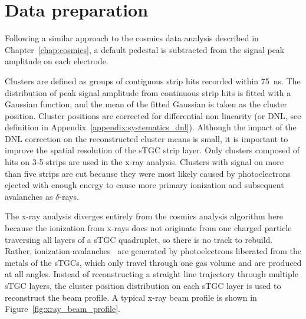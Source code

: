 \section{Data preparation}

Following a similar approach to the cosmics data analysis described in Chapter~\ref{chap:cosmics}, a default pedestal is subtracted from the signal peak amplitude on each electrode.

Clusters are defined as groups of contiguous strip hits recorded within \SI{75}{ns}. The distribution of peak signal amplitude from continuous strip hits is fitted with a Gaussian function, and the mean of the fitted Gaussian is taken as the cluster position. Cluster positions are corrected for differential non linearity (or DNL, see definition in Appendix~\ref{appendix:systematics_dnl}). Although the impact of the DNL correction on the reconstructed cluster means is small, it is important to improve the spatial resolution of the sTGC strip layer. Only clusters composed of hits on 3-5 strips are used in the x-ray analysis. Clusters with signal on more than five strips are cut because they were most likely caused by photoelectrons ejected with enough energy to cause more primary ionization and subsequent avalanches as $\delta$-rays.

The x-ray analysis diverges entirely from the cosmics analysis algorithm here because the ionization from x-rays does not originate from one charged particle traversing all layers of a sTGC quadruplet, so there is no track to rebuild. Rather, ionization avalanches~\cite{townsend_electricity_1915} are generated by photoelectrons liberated from the metals of the sTGCs, which only travel through one gas volume and are produced at all angles. Instead of reconstructing a straight line trajectory through multiple sTGC layers, the cluster position distribution on each sTGC layer is used to reconstruct the beam profile. A typical x-ray beam profile is shown in Figure~\ref{fig:xray_beam_profile}.

